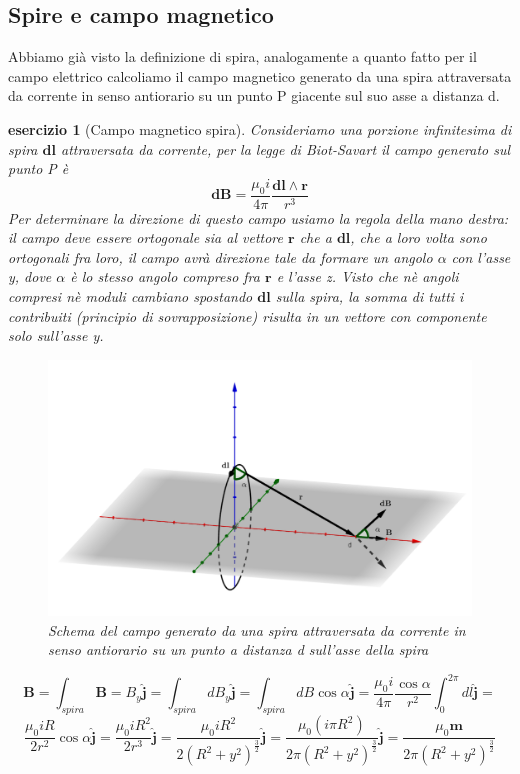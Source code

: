\documentclass[10pt,a4paper]{article}
\newtheorem{esercizio}{esercizio}
\begin{document}
\subsection{Spire e campo magnetico}
Abbiamo già visto la definizione di spira, analogamente a quanto fatto per il campo elettrico calcoliamo il campo magnetico generato da una spira attraversata da corrente in senso antiorario su un punto P giacente sul suo asse a distanza d. 
\begin{esercizio}[Campo magnetico spira]
Consideriamo una porzione infinitesima di spira \(\mathbf{dl}\) attraversata da corrente, per la legge di Biot-Savart il campo generato sul punto P è
\[\mathbf{dB}=\frac{\mu_0 i}{4\pi}\frac{\mathbf{dl}\wedge\mathbf{r}}{r^3}\]
Per determinare la direzione di questo campo usiamo la regola della mano destra: il campo deve essere ortogonale sia al vettore \(\mathbf{r}\) che a \(\mathbf{dl}\), che a loro volta sono ortogonali fra loro, il campo avrà direzione tale da formare un angolo $\alpha$ con l'asse y, dove $\alpha$ è lo stesso angolo compreso fra \(\mathbf{r}\) e l'asse z. Visto che nè angoli compresi nè moduli cambiano spostando \(\mathbf{dl}\) sulla spira, la somma di tutti i contribuiti (principio di sovrapposizione) risulta in un vettore con componente solo sull'asse y. 
\begin{figure}[h!]
	\centering
	\includegraphics[width=0.7\linewidth]{images/campo_magnetico_spira}
	\caption{Schema del campo generato da una spira attraversata da corrente in senso antiorario su un punto a distanza d sull'asse della spira}
	\label{fig:campomagneticospira}
\end{figure}
\FloatBarrier
\[\mathbf{B}=\int_{spira}\mathbf{B}= B_y\mathbf{\hat{j}}=\int_{spira}dB_y\mathbf{\hat{j}}=\int_{spira}dB\cos\alpha\mathbf{\hat{j}}=\frac{\mu_0 i}{4\pi}\frac{\cos\alpha}{r^2}\int_{0}^{2\pi}dl\mathbf{\hat{j}}=\]
\[\frac{\mu_0 i R}{2r^2}\cos\alpha \mathbf{\hat{j}}=\frac{\mu_0 i R^2}{2r^3} \mathbf{\hat{j}}=\frac{\mu_0 i R^2}{2(R^2+y^2)^{\frac{3}{2}}} \mathbf{\hat{j}}=\frac{\mu_0 (i \pi R^2)}{2\pi(R^2+y^2)^{\frac{3}{2}}} \mathbf{\hat{j}}=\frac{\mu_0 \mathbf{m}}{2\pi(R^2+y^2)^{\frac{3}{2}}}\]

\end{esercizio}
\end{document}
